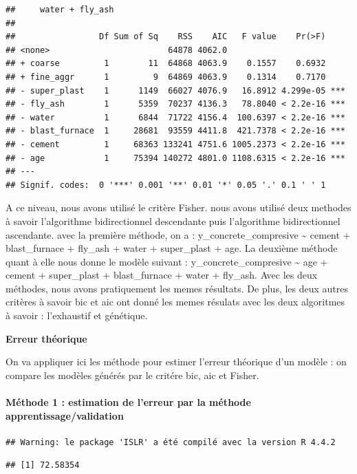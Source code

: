 \documentclass[
  12pt,
]{article}
\begin{document}
\begin{verbatim}
##     water + fly_ash
## 
##                 Df Sum of Sq    RSS    AIC   F value    Pr(>F)    
## <none>                        64878 4062.0                        
## + coarse         1        11  64868 4063.9    0.1557    0.6932    
## + fine_aggr      1         9  64869 4063.9    0.1314    0.7170    
## - super_plast    1      1149  66027 4076.9   16.8912 4.299e-05 ***
## - fly_ash        1      5359  70237 4136.3   78.8040 < 2.2e-16 ***
## - water          1      6844  71722 4156.4  100.6397 < 2.2e-16 ***
## - blast_furnace  1     28681  93559 4411.8  421.7378 < 2.2e-16 ***
## - cement         1     68363 133241 4751.6 1005.2373 < 2.2e-16 ***
## - age            1     75394 140272 4801.0 1108.6315 < 2.2e-16 ***
## ---
## Signif. codes:  0 '***' 0.001 '**' 0.01 '*' 0.05 '.' 0.1 ' ' 1
\end{verbatim}

A ce niveau, nous avons utilisé le critère Fisher. nous avons utilisé
deux methodes à savoir l'algorithme bidirectionnel descendante puis
l'algorithme bidirectionnel ascendante. avec la première méthode, on a :
y\_concrete\_compresive \textasciitilde{} cement + blast\_furnace +
fly\_ash + water + super\_plast + age. La deuxième méthode quant à elle
nous donne le modèle suivant : y\_concrete\_compresive \textasciitilde{}
age + cement + super\_plast + blast\_furnace + water + fly\_ash. Avec
les deux méthodes, nous avons pratiquement les memes résultats. De plus,
les deux autres critères à savoir bic et aic ont donné les memes
résulats avec les deux algoritmes à savoir : l'exhaustif et génétique.

\textbf{Erreur théorique}

On va appliquer ici les méthode pour estimer l'erreur théorique d'un
modèle : on compare les modèles générés par le critére bic, aic et
Fisher.

\paragraph{Méthode 1 : estimation de l'erreur par la méthode
apprentissage/validation}\label{muxe9thode-1-estimation-de-lerreur-par-la-muxe9thode-apprentissagevalidation}

\begin{verbatim}
## Warning: le package 'ISLR' a été compilé avec la version R 4.4.2
\end{verbatim}

\begin{verbatim}
## [1] 72.58354
\end{verbatim}
\end{document}
